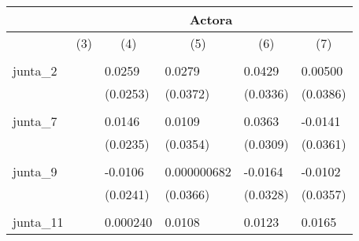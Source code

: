 \begin{tabular}{rrrrrr}
\toprule
      & \multicolumn{5}{c}{Actora} \\
\midrule
      & \multicolumn{1}{c}{(3)} & \multicolumn{1}{c}{(4)} & \multicolumn{1}{c}{(5)} & \multicolumn{1}{c}{(6)} & \multicolumn{1}{c}{(7)} \\
\multicolumn{1}{l}{} & \multicolumn{1}{l}{} & \multicolumn{1}{l}{} & \multicolumn{1}{l}{} & \multicolumn{1}{l}{} & \multicolumn{1}{l}{} \\
\multicolumn{1}{l}{junta\_2} & \multicolumn{1}{l}{} & \multicolumn{1}{l}{0.0259} & \multicolumn{1}{l}{0.0279} & \multicolumn{1}{l}{0.0429} & \multicolumn{1}{l}{0.00500} \\
\multicolumn{1}{l}{} & \multicolumn{1}{l}{} & \multicolumn{1}{l}{(0.0253)} & \multicolumn{1}{l}{(0.0372)} & \multicolumn{1}{l}{(0.0336)} & \multicolumn{1}{l}{(0.0386)} \\
\multicolumn{1}{l}{} & \multicolumn{1}{l}{} & \multicolumn{1}{l}{} & \multicolumn{1}{l}{} & \multicolumn{1}{l}{} & \multicolumn{1}{l}{} \\
\multicolumn{1}{l}{junta\_7} & \multicolumn{1}{l}{} & \multicolumn{1}{l}{0.0146} & \multicolumn{1}{l}{0.0109} & \multicolumn{1}{l}{0.0363} & \multicolumn{1}{l}{-0.0141} \\
\multicolumn{1}{l}{} & \multicolumn{1}{l}{} & \multicolumn{1}{l}{(0.0235)} & \multicolumn{1}{l}{(0.0354)} & \multicolumn{1}{l}{(0.0309)} & \multicolumn{1}{l}{(0.0361)} \\
\multicolumn{1}{l}{} & \multicolumn{1}{l}{} & \multicolumn{1}{l}{} & \multicolumn{1}{l}{} & \multicolumn{1}{l}{} & \multicolumn{1}{l}{} \\
\multicolumn{1}{l}{junta\_9} & \multicolumn{1}{l}{} & \multicolumn{1}{l}{-0.0106} & \multicolumn{1}{l}{0.000000682} & \multicolumn{1}{l}{-0.0164} & \multicolumn{1}{l}{-0.0102} \\
\multicolumn{1}{l}{} & \multicolumn{1}{l}{} & \multicolumn{1}{l}{(0.0241)} & \multicolumn{1}{l}{(0.0366)} & \multicolumn{1}{l}{(0.0328)} & \multicolumn{1}{l}{(0.0357)} \\
\multicolumn{1}{l}{} & \multicolumn{1}{l}{} & \multicolumn{1}{l}{} & \multicolumn{1}{l}{} & \multicolumn{1}{l}{} & \multicolumn{1}{l}{} \\
\multicolumn{1}{l}{junta\_11} & \multicolumn{1}{l}{} & \multicolumn{1}{l}{0.000240} & \multicolumn{1}{l}{0.0108} & \multicolumn{1}{l}{0.0123} & \multicolumn{1}{l}{0.0165} \\

\end{tabular}
